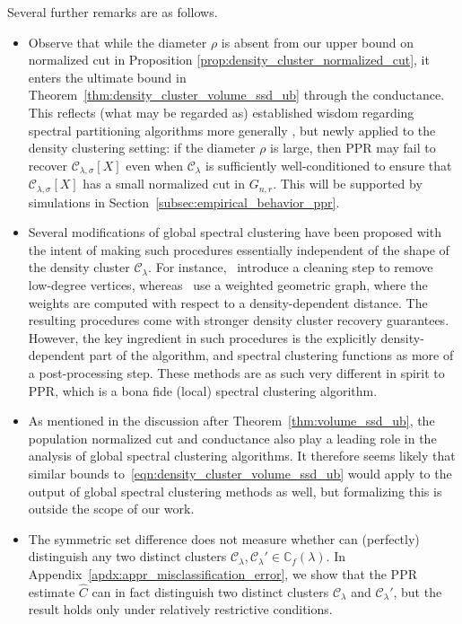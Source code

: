 \documentclass[11pt,twoside]{article}
\newcommand{\1}{\mathbf{1}}
\newcommand{\mc}[1]{\mathcal{#1}}
\newcommand{\mbb}[1]{\mathbb{#1}}
\newcommand{\wh}[1]{\widehat{#1}}
\begin{document}
Several further remarks are as follows.
\begin{itemize}
	\item Observe that while the diameter $\rho$ is absent from our upper bound on normalized cut in Proposition \ref{prop:density_cluster_normalized_cut}, it enters the ultimate bound in Theorem~\ref{thm:density_cluster_volume_ssd_ub} through the conductance. This reflects (what may be regarded as) established wisdom regarding spectral partitioning algorithms more generally \citep{guattery1995, hein2010}, but newly applied to the density clustering setting: if the diameter $\rho$ is large, then PPR	may fail to recover $\mc{C}_{\lambda,\sigma}[X]$ even when $\mc{C}_{\lambda}$ is sufficiently well-conditioned to ensure that $\mc{C}_{\lambda,\sigma}[X]$ has a small normalized cut in $G_{n,r}$. This will be supported by simulations in Section~\ref{subsec:empirical_behavior_ppr}.   
	\item Several modifications of global spectral clustering have been proposed with the intent of making such procedures essentially independent of the shape of the density cluster $\mc{C}_{\lambda}$. For instance,~\citet{arias-castro2009,pelletier2011} introduce a cleaning step to remove low-degree vertices, whereas~\cite{little2020} use a weighted geometric graph, where the weights are computed with respect to a density-dependent distance. The resulting procedures come with stronger density cluster recovery guarantees. However, the key ingredient in such procedures is the explicitly density-dependent part of the algorithm, and spectral clustering functions as more of a post-processing step. These methods are as such very different in spirit to PPR, which is a bona fide (local) spectral clustering algorithm. 
	\item As mentioned in the discussion after Theorem~\ref{thm:volume_ssd_ub}, the population normalized cut and conductance also play a leading role in the analysis of global spectral clustering algorithms. It therefore seems likely that similar bounds to~\eqref{eqn:density_cluster_volume_ssd_ub} would apply to the output of global spectral clustering methods as well, but formalizing this is outside the scope of our work.
	\item The symmetric set difference does not measure whether \smash{$\wh{C}$} can (perfectly) distinguish any two distinct clusters $\mc{C}_{\lambda},\mc{C}_{\lambda}' \in \mbb{C}_f(\lambda)$. In Appendix~\ref{apdx:appr_misclassification_error}, we show that the PPR estimate $\wh{C}$ can in fact distinguish two distinct clusters $\mc{C}_{\lambda}$ and $\mc{C}_{\lambda}'$, but the result holds only under relatively restrictive conditions.
\end{itemize}
\end{document}
